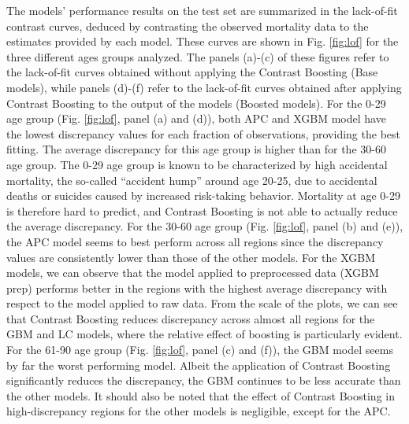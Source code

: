 \documentclass[fleqn,10pt]{wlscirep}
\begin{document}
\color{blue} The models' performance results on the test set are summarized in the lack-of-fit contrast curves, deduced by contrasting the observed mortality data to the estimates provided by each model. These curves are shown in Fig. \ref{fig:lof} for the three different ages groups analyzed. The panels (a)-(c) of these figures refer to the lack-of-fit curves obtained without applying the Contrast Boosting (Base models), while panels (d)-(f) refer to the lack-of-fit curves obtained after applying Contrast Boosting to the output of the models (Boosted models).
For the 0-29 age group (Fig. \ref{fig:lof}, panel (a) and (d)), both APC and XGBM model have the lowest discrepancy values for each fraction of observations, providing the best fitting. The average discrepancy for this age group is higher than for the 30-60 age group. The 0-29 age group is known to be characterized by high accidental mortality, the so-called “accident hump” around age 20-25, due to accidental deaths or suicides caused by increased risk-taking behavior. Mortality at age 0-29 is therefore hard to predict, and Contrast Boosting is not able to actually reduce the average discrepancy. \color{black}
For the 30-60 age group (Fig. \ref{fig:lof}, panel (b) and (e)), the APC model seems to best perform across all regions since the discrepancy values are consistently lower than those of the other models. For the XGBM models, we can observe that the model applied to preprocessed data (XGBM prep) performs better in the regions with the highest average discrepancy with respect to the model applied to raw data. From the scale of the plots, we can see that Contrast Boosting reduces discrepancy across almost all regions for the GBM and LC models, where the relative effect of boosting is particularly evident. 
For the 61-90 age group (Fig. \ref{fig:lof}, panel (c) and (f)), the GBM model seems by far the worst performing model. 
Albeit the application of Contrast Boosting significantly reduces the discrepancy, the GBM continues to be less accurate than the other models. It should also be noted that the effect of Contrast Boosting in high-discrepancy regions for the other models is negligible, except for the APC.
\end{document}
